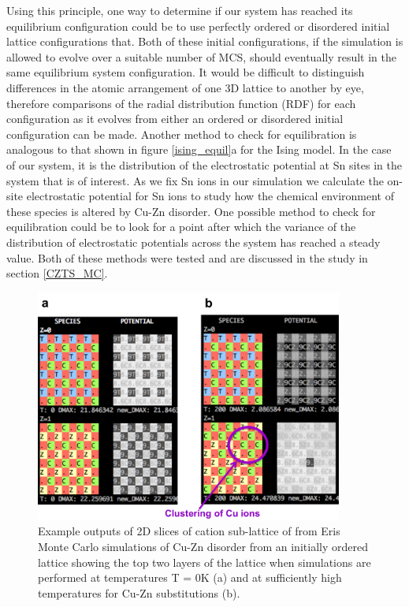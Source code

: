 \documentclass[11pt, twoside]{report}
\begin{document}
Using this principle, one way to determine if our system has reached its equilibrium configuration could be to use perfectly ordered or disordered initial lattice configurations that. Both of these initial configurations, if the simulation is allowed to evolve over a suitable number of MCS, should eventually result in the same equilibrium system configuration. It would be difficult to distinguish differences in the atomic arrangement of one 3D lattice to another by eye, therefore comparisons of the radial distribution function (RDF) for each configuration as it evolves from either an ordered or disordered initial configuration can be made. 
Another method to check for equilibration is analogous to that shown in figure \ref{ising_equil}a for the Ising model. In the case of our system, it is the distribution of the electrostatic potential at Sn sites in the system that is of interest. As we fix Sn ions in our simulation we calculate the on-site electrostatic potential for Sn ions to study how the chemical environment of these species is altered by Cu-Zn disorder. One possible method to check for equilibration could be to look for a point after which the variance of the distribution of electrostatic potentials across the system has reached a steady value. Both of these methods were tested and are discussed in the study in section \ref{CZTS_MC}.

\begin{figure}[h!]
  \centering
    \includegraphics[width=0.9\textwidth]{figures/eris_spatial_disorder.png}
    \caption{Example outputs of 2D slices of cation sub-lattice of {\CZTS} from Eris Monte Carlo simulations of Cu-Zn disorder from an initially ordered lattice showing the top two layers of the lattice when simulations are performed at temperatures T = 0K (a) and at sufficiently high temperatures for Cu-Zn substitutions (b).}
  \label{eris_spatial_disorder}
\end{figure}
\end{document}
